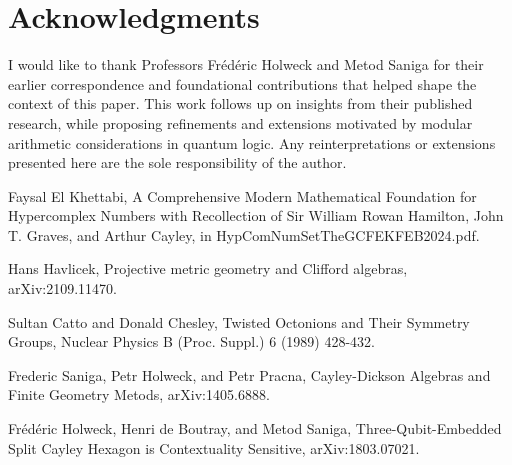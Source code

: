 \documentclass{article}
\begin{document}
\section*{Acknowledgments}
I would like to thank Professors Frédéric Holweck and Metod Saniga for their earlier correspondence and foundational contributions that helped shape the context of this paper. This work follows up on insights from their published research, while proposing refinements and extensions motivated by modular arithmetic considerations in quantum logic. Any reinterpretations or extensions presented here are the sole responsibility of the author.

\begin{thebibliography}{9}

Faysal El Khettabi, A Comprehensive Modern Mathematical Foundation for Hypercomplex Numbers with Recollection of Sir William Rowan Hamilton, John T. Graves, and Arthur Cayley, in HypComNumSetTheGCFEKFEB2024.pdf.

Hans Havlicek, Projective metric geometry and Clifford algebras, arXiv:2109.11470.

Sultan Catto and Donald Chesley, Twisted Octonions and Their Symmetry Groups, Nuclear Physics B (Proc. Suppl.) 6 (1989) 428-432.

Frederic Saniga, Petr Holweck, and Petr Pracna, Cayley-Dickson Algebras and Finite Geometry Metods, arXiv:1405.6888.

Frédéric Holweck, Henri de Boutray, and Metod Saniga, Three-Qubit-Embedded Split Cayley Hexagon is Contextuality Sensitive, arXiv:1803.07021.

\end{thebibliography}
\end{document}
